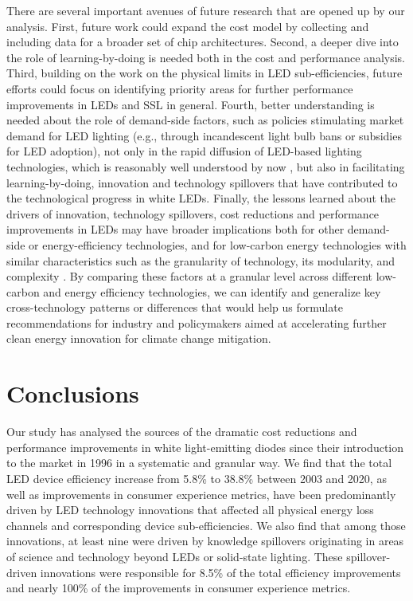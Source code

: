 \documentclass[parskip=full]{article}
\begin{document}
There are several important avenues of future research that are opened up by our analysis. First, future work could expand the cost model by collecting and including data for a broader set of chip architectures. Second, a deeper dive into the role of learning-by-doing is needed both in the cost and performance analysis. Third, building on the work on the physical limits in LED sub-efficiencies, future efforts could focus on identifying priority areas for further performance improvements in LEDs and SSL in general. Fourth, better understanding is needed about the role of demand-side factors, such as policies stimulating market demand for LED lighting (e.g., through incandescent light bulb bans or subsidies for LED adoption), not only in the rapid diffusion of LED-based lighting technologies, which is reasonably well understood by now \cite{Mills2014, Kamat2020, weinold2020technology, stegmaier2021incandescent, grubb2021new}, but also in facilitating learning-by-doing, innovation and technology spillovers that have contributed to the technological progress in white LEDs. Finally, the lessons learned about the drivers of innovation, technology spillovers, cost reductions and performance improvements in LEDs may have broader implications both for other demand-side or energy-efficiency technologies, and for low-carbon energy technologies with similar characteristics such as the granularity of technology, its modularity, and complexity \cite{malhotra2020accelerating, Wilson2012}. By comparing these factors at a granular level across different low-carbon and energy efficiency technologies, we can identify and generalize key cross-technology patterns or differences that would help us formulate recommendations for industry and policymakers aimed at accelerating further clean energy innovation for climate change mitigation.

\section{Conclusions}

Our study has analysed the sources of the dramatic cost reductions and performance improvements in white light-emitting diodes since their introduction to the market in 1996 in a systematic and granular way. We find that the total LED device efficiency increase from 5.8\% to 38.8\% between 2003 and 2020, as well as improvements in consumer experience metrics, have been predominantly driven by LED technology innovations that affected all physical energy loss channels and corresponding device sub-efficiencies. We also find that among those innovations, at least nine were driven by knowledge spillovers originating in areas of science and technology beyond LEDs or solid-state lighting. These spillover-driven innovations were responsible for 8.5\% of the total efficiency improvements and nearly 100\% of the improvements in consumer experience metrics. 
\end{document}
